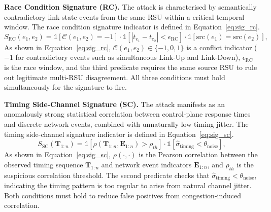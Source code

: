 \textbf{Race Condition Signature (RC).}
The attack is characterised by semantically contradictory
link-state events from the same RSU within a critical temporal
window. The race condition signature indicator is defined in
Equation~\eqref{eq:sig_rc}.
\begin{equation}
S_{\mathrm{RC}}(e_1, e_2) =
  \mathbb{1}\!\left[\mathcal{C}(e_1,e_2){=}{-}1\right]
  \cdot\mathbb{1}\!\left[|t_{e_1}{-}t_{e_2}| < \epsilon_{\mathrm{RC}}\right]
  \cdot\mathbb{1}\!\left[\mathrm{src}(e_1){=}\mathrm{src}(e_2)\right],
\label{eq:sig_rc}
\end{equation}
As shown in Equation~\eqref{eq:sig_rc},
$\mathcal{C}(e_1,e_2)\in\{-1,0,1\}$ is a conflict indicator
($-1$ for contradictory events such as simultaneous Link-Up
and Link-Down), $\epsilon_{\mathrm{RC}}$ is the race window,
and the third predicate requires the same source RSU to rule
out legitimate multi-RSU disagreement. All three conditions
must hold simultaneously for the signature to fire.

\textbf{Timing Side-Channel Signature (SC).}
The attack manifests as an anomalously strong statistical
correlation between control-plane response times and discrete
network events, combined with unnaturally low timing jitter.
The timing side-channel signature indicator is defined in
Equation~\eqref{eq:sig_sc}.
\begin{equation}
S_{\mathrm{SC}}(\mathbf{T}_{1:n}) =
  \mathbb{1}\!\left[\rho(\mathbf{T}_{1:n},\mathbf{E}_{1:n})
    > \rho_{th}\right]
  \cdot
  \mathbb{1}\!\left[\hat{\sigma}_{\mathrm{timing}}
    < \theta_{\mathrm{noise}}\right],
\label{eq:sig_sc}
\end{equation}
As shown in Equation~\eqref{eq:sig_sc}, $\rho(\cdot,\cdot)$
is the Pearson correlation between the observed timing sequence
$\mathbf{T}_{1:n}$ and network event indicators
$\mathbf{E}_{1:n}$, and $\rho_{th}$ is the suspicious
correlation threshold. The second predicate checks that
$\hat{\sigma}_{\mathrm{timing}} < \theta_{\mathrm{noise}}$,
indicating the timing pattern is too regular to arise from
natural channel jitter. Both conditions must hold to reduce
false positives from congestion-induced correlation.

